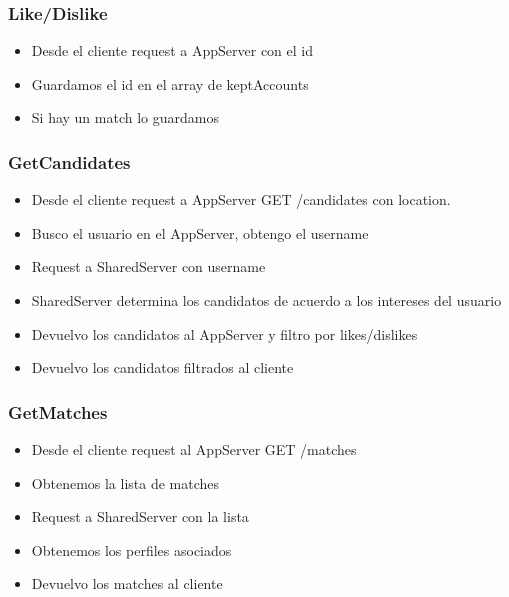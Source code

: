 \documentclass[letterpaper,10pt,english]{sphinxmanual}
\begin{document}
\subsubsection{Like/Dislike}
\label{manuals:like-dislike}\begin{itemize}
\item {} 
Desde el cliente request a AppServer con el id

\item {} 
Guardamos el id en el array de keptAccounts

\item {} 
Si hay un match lo guardamos

\end{itemize}


\subsubsection{GetCandidates}
\label{manuals:getcandidates}\begin{itemize}
\item {} 
Desde el cliente request a AppServer  GET /candidates con location.

\item {} 
Busco el usuario en el AppServer, obtengo el username

\item {} 
Request a SharedServer con username

\item {} 
SharedServer determina los candidatos de acuerdo a los intereses del usuario

\item {} 
Devuelvo los candidatos al AppServer y filtro por likes/dislikes

\item {} 
Devuelvo los candidatos filtrados al cliente

\end{itemize}


\subsubsection{GetMatches}
\label{manuals:getmatches}\begin{itemize}
\item {} 
Desde el cliente request al AppServer GET /matches

\item {} 
Obtenemos la lista de matches

\item {} 
Request a SharedServer con la lista

\item {} 
Obtenemos los perfiles asociados

\item {} 
Devuelvo los matches al cliente

\end{itemize}
\end{document}
